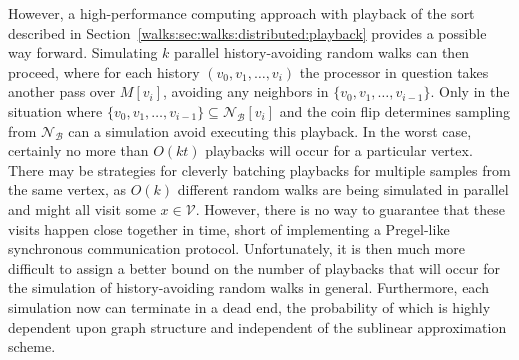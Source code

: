 \documentclass[10]{article}
\begin{document}
However, a high-performance computing approach with playback of the sort described in Section~\ref{walks:sec:walks:distributed:playback} provides a possible way forward.
Simulating $k$ parallel history-avoiding random walks can then proceed, where for each history $(v_0, v_1, \dots, v_i)$ the processor in question takes another pass over $M[v_i]$, avoiding any neighbors in $\{v_0, v_1, \dots, v_{i - 1}\}$. 
Only in the situation where $\{v_0, v_1, \dots, v_{i-1}\} \subseteq \mathcal{N}_\mathcal{B}[v_i]$ and the coin flip determines sampling from $\mathcal{N}_\mathcal{B}$ can a simulation avoid executing this playback.
In the worst case, certainly no more than $O(kt)$ playbacks will occur for a particular vertex.
There may be strategies for cleverly batching playbacks for multiple samples from the same vertex, as $O(k)$ different random walks are being simulated in parallel and might all visit some $x \in \mathcal{V}$.
However, there is no way to guarantee that these visits happen close together in time, short of implementing a Pregel-like synchronous communication protocol.
Unfortunately, it is then much more difficult to assign a better bound on the number of playbacks that will occur for the simulation of history-avoiding random walks in general.
Furthermore, each simulation now can terminate in a dead end, the probability of which is highly dependent upon graph structure and independent of the sublinear approximation scheme.






% 
 
 

\end{document}

